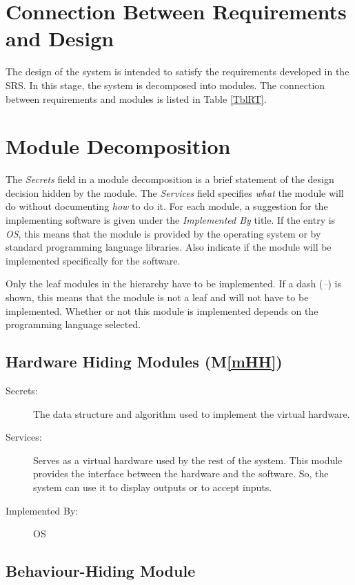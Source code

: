 \documentclass[12pt, titlepage]{article}
\newcommand{\mref}[1]{M\ref{#1}}
\begin{document}
\section{Connection Between Requirements and Design} \label{SecConnection}

The design of the system is intended to satisfy the requirements developed in
the SRS. In this stage, the system is decomposed into modules. The connection
between requirements and modules is listed in Table \ref{TblRT}.

\section{Module Decomposition} \label{SecMD}

The \emph{Secrets} field in a module decomposition is a brief statement of the design decision hidden by the module. 
The \emph{Services} field specifies \emph{what} the module will do without documenting \emph{how} to do it. 
For each module, a suggestion for the implementing software is given under the \emph{Implemented By} title. 
If the entry is \emph{OS}, this means that the module is provided by the operating system or by standard programming language libraries.
Also indicate if the module will be implemented specifically for the software.

Only the leaf modules in the hierarchy have to be implemented. 
If a dash (\emph{--}) is shown, this means that the module is not a leaf and will not have to be implemented. 
Whether or not this module is implemented depends on the programming language selected.

\subsection{Hardware Hiding Modules (\mref{mHH})}

\begin{description}
\item[Secrets:]The data structure and algorithm used to implement the virtual
  hardware.
\item[Services:]Serves as a virtual hardware used by the rest of the
  system. This module provides the interface between the hardware and the
  software. So, the system can use it to display outputs or to accept inputs.
\item[Implemented By:] OS
\end{description}

\subsection{Behaviour-Hiding Module}
\end{document}

